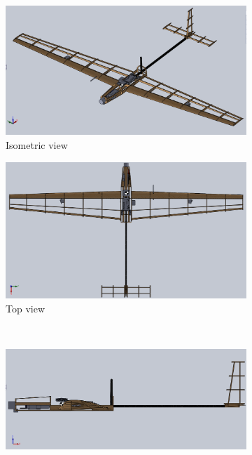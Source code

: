 \documentclass[11pt]{article}
\begin{document}
    \begin{figure}[h!]
    	\centering
    	\begin{subfigure}[b]{0.49\textwidth}
    		\includegraphics[width=\textwidth]{Figures/CAD/iso.png}
    		\caption{Isometric view}
    	\end{subfigure}
    	\begin{subfigure}[b]{0.49\textwidth}
    		\includegraphics[width=\textwidth]{Figures/CAD/top.png}
    		\caption{Top view}
    	\end{subfigure}
    	\\
    	\begin{subfigure}[b]{0.49\textwidth}
    		\includegraphics[width=\textwidth]{Figures/CAD/side.png}

\end{subfigure}
\end{figure}
\end{document}
